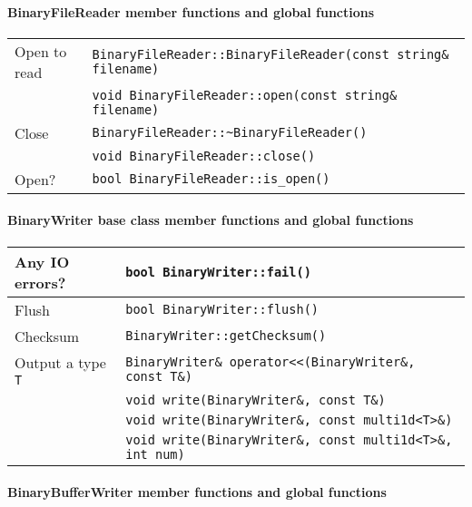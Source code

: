 \documentclass[12pt,letterpaper]{article}
\begin{document}
\paragraph{BinaryFileReader member functions and global functions}

\begin{flushleft}
  \begin{tabular}{|l|l|}
  \hline
  Open to read   & \verb|BinaryFileReader::BinaryFileReader(const string& filename)|\\
                 & \verb|void BinaryFileReader::open(const string& filename)|\\
  \hline
  Close          & \verb|BinaryFileReader::~BinaryFileReader()|\\
                 & \verb|void BinaryFileReader::close()|\\
  \hline
  Open?          & \verb|bool BinaryFileReader::is_open()| \\
  \hline
 \end{tabular}
\end{flushleft}

\paragraph{BinaryWriter base class member functions and global functions}

\begin{flushleft}
  \begin{tabular}{|l|l|}
  \hline
  Any IO errors? & \verb|bool BinaryWriter::fail()| \\
  \hline
  Flush          & \verb|bool BinaryWriter::flush()| \\
  \hline
  Checksum       & \verb|BinaryWriter::getChecksum()|\\
  \hline
  Output a type \verb|T| & \verb|BinaryWriter& operator<<(BinaryWriter&, const T&)| \\
                 & \verb|void write(BinaryWriter&, const T&)| \\
                 & \verb|void write(BinaryWriter&, const multi1d<T>&)| \\
                 & \verb|void write(BinaryWriter&, const multi1d<T>&, int num)| \\
  \hline
 \end{tabular}
\end{flushleft}
\paragraph{BinaryBufferWriter member functions and global functions}
\end{document}
